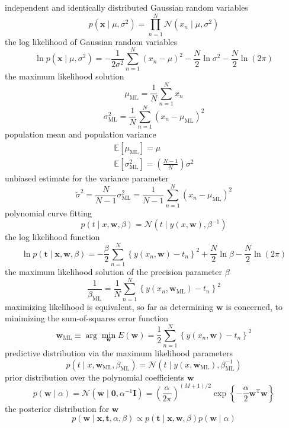 \documentclass{article}
\begin{document}
	independent and identically distributed Gaussian random variables
	$$
	p\left(\mathbf{x} \mid \mu, \sigma^{2}\right)=\prod_{n=1}^{N} \mathcal{N}\left(x_{n} \mid \mu, \sigma^{2}\right)
	$$
	the log likelihood of Gaussian random variables
	$$
	\ln p\left(\mathbf{x} \mid \mu, \sigma^{2}\right)=-\frac{1}{2 \sigma^{2}} \sum_{n=1}^{N}\left(x_{n}-\mu\right)^{2}-\frac{N}{2} \ln \sigma^{2}-\frac{N}{2} \ln (2 \pi)
	$$
	the maximum likelihood solution
	$$
	\mu_{\mathrm{ML}}=\frac{1}{N} \sum_{n=1}^{N} x_{n}
	$$
	$$
	\sigma_{\mathrm{ML}}^{2}=\frac{1}{N} \sum_{n=1}^{N}\left(x_{n}-\mu_{\mathrm{ML}}\right)^{2}
	$$
	population mean and population variance 
	$$
	\begin{array}{l}
	\mathbb{E}\left[\mu_{\mathrm{ML}}\right]=\mu \\
	\mathbb{E}\left[\sigma_{\mathrm{ML}}^{2}\right]=\left(\frac{N-1}{N}\right) \sigma^{2}
	\end{array}
	$$
	unbiased estimate for the variance parameter
	$$
	\widetilde{\sigma}^{2}=\frac{N}{N-1} \sigma_{\mathrm{ML}}^{2}=\frac{1}{N-1} \sum_{n=1}^{N}\left(x_{n}-\mu_{\mathrm{ML}}\right)^{2}
	$$
	polynomial curve fitting
	$$
	p(t \mid x, \mathbf{w}, \beta)=\mathcal{N}\left(t \mid y(x, \mathbf{w}), \beta^{-1}\right)
	$$
	the log likelihood function
	$$
	\ln p(\mathbf{t} \mid \mathbf{x}, \mathbf{w}, \beta)=-\frac{\beta}{2} \sum_{n=1}^{N}\left\{y\left(x_{n}, \mathbf{w}\right)-t_{n}\right\}^{2}+\frac{N}{2} \ln \beta-\frac{N}{2} \ln (2 \pi)
	$$
	the maximum likelihood solution of the precision parameter $\beta$
	$$
	\frac{1}{\beta_{\mathrm{ML}}}=\frac{1}{N} \sum_{n=1}^{N}\left\{y\left(x_{n}, \mathbf{w}_{\mathrm{ML}}\right)-t_{n}\right\}^{2}
	$$
	maximizing likelihood is equivalent, so far as determining $\mathbf{w}$ is concerned, to minimizing the sum-of-squares error function
	$$
	\mathbf{w}_{\mathrm{ML}}\equiv\arg\min_{\mathbf{w}}E(\mathbf{w})=
	\frac{1}{2} \sum_{n=1}^{N}\left\{y\left(x_{n}, \mathbf{w}\right)-t_{n}\right\}^{2}
	$$
	predictive distribution via the maximum likelihood parameters
	$$
	p\left(t \mid x, \mathbf{w}_{\mathrm{ML}}, \beta_{\mathrm{ML}}\right)=\mathcal{N}\left(t \mid y\left(x, \mathbf{w}_{\mathrm{ML}}\right), \beta_{\mathrm{ML}}^{-1}\right)
	$$
	prior distribution over the polynomial coefficients $\mathbf{w}$
	$$
	p(\mathbf{w} \mid \alpha)=\mathcal{N}\left(\mathbf{w} \mid \mathbf{0}, \alpha^{-1} \mathbf{I}\right)=\left(\frac{\alpha}{2 \pi}\right)^{(M+1) / 2} \exp \left\{-\frac{\alpha}{2} \mathbf{w}^{\mathrm{T}} \mathbf{w}\right\}
	$$
	the posterior distribution for $\mathbf{w}$
	$$
	p(\mathbf{w} \mid \mathbf{x}, \mathbf{t}, \alpha, \beta) \propto p(\mathbf{t} \mid \mathbf{x}, \mathbf{w}, \beta) p(\mathbf{w} \mid \alpha)
	$$
\end{document}
